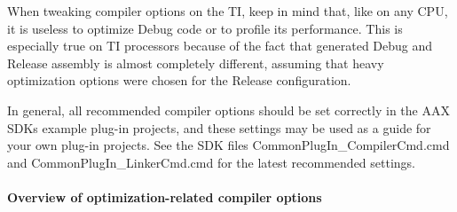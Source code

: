 When tweaking compiler options on the TI, keep in mind that, like on any C\+PU, it is useless to optimize Debug code or to profile its performance. This is especially true on TI processors because of the fact that generated Debug and Release assembly is almost completely different, assuming that heavy optimization options were chosen for the Release configuration.

In general, all recommended compiler options should be set correctly in the A\+AX S\+DK\textquotesingle{}s example plug-\/in projects, and these settings may be used as a guide for your own plug-\/in projects. See the S\+DK files Common\+Plug\+In\+\_\+\+Compiler\+Cmd.\+cmd and Common\+Plug\+In\+\_\+\+Linker\+Cmd.\+cmd for the latest recommended settings.

\hypertarget{a00832_subsubsection__overview_of_optimizationrelated_compiler_options_}{}\paragraph{Overview of optimization-\/related compiler options}\label{a00832_subsubsection__overview_of_optimizationrelated_compiler_options_}
 
